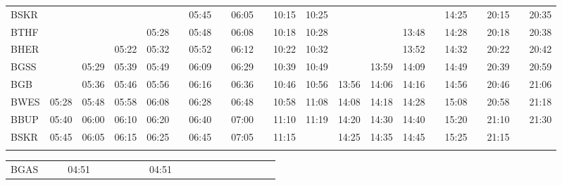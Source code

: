 \begin{center}
\begin{tabular}
\begin{tabular}
\begin{tabular}{!{\color{lightbrown}\vrule width 3pt}l!{\color{lightbrown}\vrule width 3pt}*{19}{c|}c!{\color{lightbrown}\vrule width 3pt}}
\hline
{}
 \\
\hline
BSKR     &
      &       &       &       &          & 05:45 &          & 06:05 &  & 10:15 & 10:25 &       &       &       &          & 14:25 &  & 20:15 &  & 20:35 \\
BTHF     &
      &       &       & 05:28 &  & 05:48 &  & 06:08 & \lbr{}   & 10:18 & 10:28 &       &       & 13:48 &  & 14:28 & \lbr{}   & 20:18 & \lbr{}   & 20:38 \\
BHER     &
      &       & 05:22 & 05:32 & \lbr{}   & 05:52 & \lbr{}   & 06:12 & \lbr{}   & 10:22 & 10:32 &       &       & 13:52 & \lbr{}   & 14:32 & \lbr{}   & 20:22 & \lbr{}   & 20:42 \\
BGSS     &
      & 05:29 & 05:39 & 05:49 & \lbr{}   & 06:09 & \lbr{}   & 06:29 & \lbr{}   & 10:39 & 10:49 &       & 13:59 & 14:09 & \lbr{}   & 14:49 & \lbr{}   & 20:39 & \lbr{}   & 20:59 \\
BGB      &
      & 05:36 & 05:46 & 05:56 & \lbr{}   & 06:16 & \lbr{}   & 06:36 & \lbr{}   & 10:46 & 10:56 & 13:56 & 14:06 & 14:16 & \lbr{}   & 14:56 & \lbr{}   & 20:46 & \lbr{}   & 21:06 \\
BWES     &
05:28 & 05:48 & 05:58 & 06:08 & \lbr{}   & 06:28 & \lbr{}   & 06:48 & \lbr{}   & 10:58 & 11:08 & 14:08 & 14:18 & 14:28 & \lbr{}   & 15:08 & \lbr{}   & 20:58 & \lbr{}   & 21:18 \\
BBUP     &
05:40 & 06:00 & 06:10 & 06:20 & \lbr{}   & 06:40 & \lbr{}   & 07:00 & \lbr{}   & 11:10 & 11:19 & 14:20 & 14:30 & 14:40 & \lbr{}   & 15:20 & \lbr{}   & 21:10 & \lbr{}   & 21:30 \\
BSKR     &
05:45 & 06:05 & 06:15 & 06:25 & \lbr{}   & 06:45 & \lbr{}   & 07:05 & \lbr{}   & 11:15 &       & 14:25 & 14:35 & 14:45 & \lbr{}   & 15:25 & \lbr{}   & 21:15 &          &       \\
\myhline
\end{tabular}
\fi
\fi
\ifulrich
\begin{tabular}{!{\color{mbrown}\vrule width 3pt}l!{\color{mbrown}\vrule width 3pt}*{5}{c|}c!{\color{mbrown}\vrule width 3pt}
*{6}{c|}c!{\color{mbrown}\vrule width 3pt}*{5}{c|}c!{\color{mbrown}\vrule width 3pt}}
\hline
{}
 &  &  \\
\hline
BGAS     &
      &       & 04:51 &       &          &       &
      &       & 04:51 &       &       &          &       &

\end{tabular}
\end{tabular}
\end{tabular}
\end{center}
